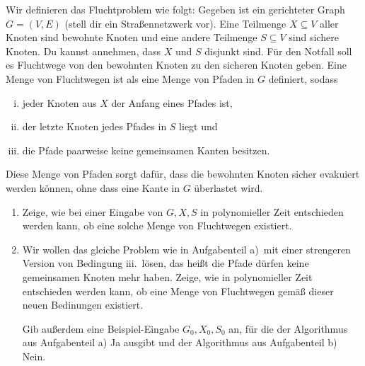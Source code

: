 \documentclass{uebung_cs}
\begin{document}
\begin{exercise}[Fluchtwege][\atschool\mittel]
    Wir definieren das Fluchtproblem wie folgt: Gegeben ist ein gerichteter Graph $G = (V,E)$ (stell dir ein Straßennetzwerk vor). Eine Teilmenge $X \subseteq V$ aller Knoten sind bewohnte Knoten und eine andere Teilmenge $S \subseteq V$ sind sichere Knoten. Du kannst annehmen, dass $X$ und $S$ disjunkt sind. Für den Notfall soll es Fluchtwege von den bewohnten Knoten zu den sicheren Knoten geben. Eine Menge von Fluchtwegen ist als eine Menge von Pfaden in $G$ definiert, sodass
    \begin{enumerate}[i.]
      \item jeder Knoten aus $X$ der Anfang eines Pfades ist,
      \item der letzte Knoten jedes Pfades in $S$ liegt und
      \item die Pfade paarweise keine gemeinsamen Kanten besitzen.   
    \end{enumerate}
    Diese Menge von Pfaden sorgt dafür, dass die bewohnten Knoten sicher evakuiert werden können, ohne dass eine Kante in $G$ überlastet wird.
    \begin{enumerate}
    	\item Zeige, wie bei einer Eingabe von $G, X, S$ in polynomieller Zeit entschieden werden kann, ob eine solche Menge von Fluchtwegen existiert.
    	\item Wir wollen das gleiche Problem wie in Aufgabenteil a)~mit einer strengeren Version von Bedingung iii.~lösen, das heißt die Pfade dürfen keine gemeinsamen Knoten mehr haben.
    	Zeige, wie in polynomieller Zeit entschieden werden kann, ob eine Menge von Fluchtwegen gemäß dieser neuen Bedinungen existiert.
    	
    	Gib außerdem eine Beispiel-Eingabe $G_0, X_0, S_0$ an, für die der Algorithmus aus Aufgabenteil a) \glqq Ja\grqq{} ausgibt und der Algorithmus aus Aufgabenteil b) \glqq Nein\grqq.
    \end{enumerate}
\end{exercise}
\end{document}
